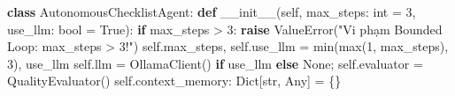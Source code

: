 \documentclass[]{article}
\newenvironment{Shaded}{}{}
\newcommand{\BuiltInTok}[1]{#1}
\newcommand{\ControlFlowTok}[1]{\textcolor[rgb]{0.00,0.44,0.13}{\textbf{#1}}}
\newcommand{\DecValTok}[1]{\textcolor[rgb]{0.25,0.63,0.44}{#1}}
\newcommand{\FunctionTok}[1]{\textcolor[rgb]{0.02,0.16,0.49}{#1}}
\newcommand{\KeywordTok}[1]{\textcolor[rgb]{0.00,0.44,0.13}{\textbf{#1}}}
\newcommand{\NormalTok}[1]{#1}
\newcommand{\OperatorTok}[1]{\textcolor[rgb]{0.40,0.40,0.40}{#1}}
\newcommand{\PreprocessorTok}[1]{\textcolor[rgb]{0.74,0.48,0.00}{#1}}
\newcommand{\StringTok}[1]{\textcolor[rgb]{0.25,0.44,0.63}{#1}}
\newcommand{\VariableTok}[1]{\textcolor[rgb]{0.10,0.09,0.49}{#1}}
\begin{document}
\begin{Shaded}
\begin{Highlighting}[]
\KeywordTok{class}\NormalTok{ AutonomousChecklistAgent:}
    \KeywordTok{def} \FunctionTok{__init__}\NormalTok{(}\VariableTok{self}\NormalTok{, max_steps: }\BuiltInTok{int} \OperatorTok{=} \DecValTok{3}\NormalTok{, use_llm: }\BuiltInTok{bool} \OperatorTok{=} \VariableTok{True}\NormalTok{):}
        \ControlFlowTok{if}\NormalTok{ max_steps }\OperatorTok{>} \DecValTok{3}\NormalTok{: }\ControlFlowTok{raise} \PreprocessorTok{ValueError}\NormalTok{(}\StringTok{"Vi phạm Bounded Loop: max_steps > 3!"}\NormalTok{)}
        \VariableTok{self}\NormalTok{.max_steps, }\VariableTok{self}\NormalTok{.use_llm }\OperatorTok{=} \BuiltInTok{min}\NormalTok{(}\BuiltInTok{max}\NormalTok{(}\DecValTok{1}\NormalTok{, max_steps), }\DecValTok{3}\NormalTok{), use_llm}
        \VariableTok{self}\NormalTok{.llm }\OperatorTok{=}\NormalTok{ OllamaClient() }\ControlFlowTok{if}\NormalTok{ use_llm }\ControlFlowTok{else} \VariableTok{None}\OperatorTok{;} \VariableTok{self}\NormalTok{.evaluator }\OperatorTok{=}\NormalTok{ QualityEvaluator()}
        \VariableTok{self}\NormalTok{.context_memory: Dict[}\BuiltInTok{str}\NormalTok{, Any] }\OperatorTok{=}\NormalTok{ \{\}}


\end{Highlighting}
\end{Shaded}
\end{document}
